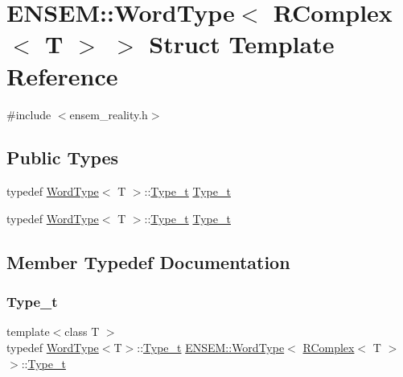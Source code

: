 \hypertarget{structENSEM_1_1WordType_3_01RComplex_3_01T_01_4_01_4}{}\section{E\+N\+S\+EM\+:\+:Word\+Type$<$ R\+Complex$<$ T $>$ $>$ Struct Template Reference}
\label{structENSEM_1_1WordType_3_01RComplex_3_01T_01_4_01_4}


{\ttfamily \#include $<$ensem\+\_\+reality.\+h$>$}

\subsection*{Public Types}
\begin{DoxyCompactItemize}
\item 
typedef \mbox{\hyperlink{structENSEM_1_1WordType}{Word\+Type}}$<$ T $>$\+::\mbox{\hyperlink{structENSEM_1_1WordType_3_01RComplex_3_01T_01_4_01_4_a24d907e746d8f478924d91103a7da3d5}{Type\+\_\+t}} \mbox{\hyperlink{structENSEM_1_1WordType_3_01RComplex_3_01T_01_4_01_4_a24d907e746d8f478924d91103a7da3d5}{Type\+\_\+t}}
\item 
typedef \mbox{\hyperlink{structENSEM_1_1WordType}{Word\+Type}}$<$ T $>$\+::\mbox{\hyperlink{structENSEM_1_1WordType_3_01RComplex_3_01T_01_4_01_4_a24d907e746d8f478924d91103a7da3d5}{Type\+\_\+t}} \mbox{\hyperlink{structENSEM_1_1WordType_3_01RComplex_3_01T_01_4_01_4_a24d907e746d8f478924d91103a7da3d5}{Type\+\_\+t}}
\end{DoxyCompactItemize}


\subsection{Member Typedef Documentation}
\mbox{\label{structENSEM_1_1WordType_3_01RComplex_3_01T_01_4_01_4_a24d907e746d8f478924d91103a7da3d5}} 
\subsubsection{\texorpdfstring{Type\_t}{Type\_t}\hspace{0.1cm}{\footnotesize\ttfamily [1/2]}}
{\footnotesize\ttfamily template$<$class T $>$ \\
typedef \mbox{\hyperlink{structENSEM_1_1WordType}{Word\+Type}}$<$T$>$\+::\mbox{\hyperlink{structENSEM_1_1WordType_3_01RComplex_3_01T_01_4_01_4_a24d907e746d8f478924d91103a7da3d5}{Type\+\_\+t}} \mbox{\hyperlink{structENSEM_1_1WordType}{E\+N\+S\+E\+M\+::\+Word\+Type}}$<$ \mbox{\hyperlink{classENSEM_1_1RComplex}{R\+Complex}}$<$ T $>$ $>$\+::\mbox{\hyperlink{structENSEM_1_1WordType_3_01RComplex_3_01T_01_4_01_4_a24d907e746d8f478924d91103a7da3d5}{Type\+\_\+t}}}

